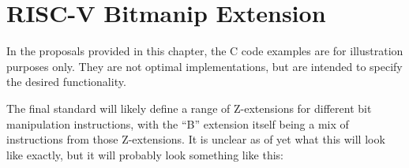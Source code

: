 \chapter{RISC-V Bitmanip Extension}
\label{bext}

In the proposals provided in this chapter, the C code examples are for
illustration purposes only. They are not optimal implementations, but are
intended to specify the desired functionality.

The final standard will likely define a range of Z-extensions for different bit
manipulation instructions, with the ``B'' extension itself being a mix of
instructions from those Z-extensions. It is unclear as of yet what this will
look like exactly, but it will probably look something like this:

